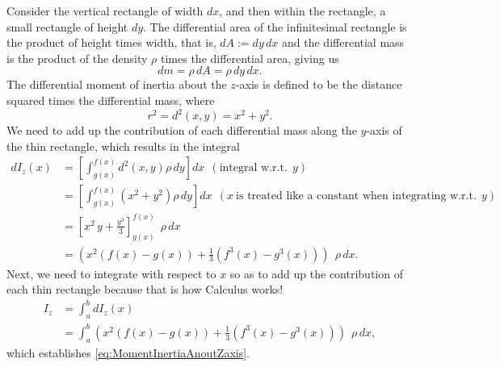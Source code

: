 Consider the vertical rectangle of width $dx$, and then within the rectangle, a small rectangle of height $dy$. The differential area of the infinitesimal rectangle is the product of height times width, that is, $dA := dy\, dx$ and the differential mass is the product of the density $\rho$ times the differential area, giving us
\begin{equation}
    dm = \rho \, dA = \rho \, dy \, dx.
\end{equation}
The differential moment of inertia about the $z$-axis is defined to be the distance squared times the differential mass, where 
$$r^2 = d^2(x, y) = x^2 + y^2.$$
We need to add up the contribution of each differential mass along the $y$-axis of the thin rectangle, which results in the integral
\begin{equation}
\begin{aligned}
    dI_z(x) &= \left[\int_{g(x)}^{f(x)} d^2(x,y) \rho \,  dy \right] dx ~~(\text{integral w.r.t.}~~y)\\[1em]
    & =  \left[\int_{g(x)}^{f(x)} (x^2 + y^2) \rho \,  dy \right] dx ~~(x~\text{is treated like a constant when integrating w.r.t.}~~y)\\[1em]
    & = \left[ x^2 \, y + \frac{y^3}{3}   \right]_{g(x)}^{f(x)}~~ \rho \, dx \\[1em]
    & = \left( x^2(f(x) - g(x)) + \frac{1}{3} (f^3(x) - g^3(x)) \right) ~~ \rho \, dx.
\end{aligned}    
\end{equation}
Next, we need to integrate with respect to $x$ so as to add up the contribution of each thin rectangle because that is how Calculus works!
\begin{equation}
    \begin{aligned}
        I_z & = \int_a^b dI_z(x) \\[1em]
        & =\int_a^b \left( x^2(f(x) - g(x)) + \frac{1}{3} (f^3(x) - g^3(x)) \right) ~~ \rho \, dx,
    \end{aligned}
\end{equation}
which establishes \eqref{eq:MomentInertiaAnoutZaxis}.
\Qed

\bigskip




